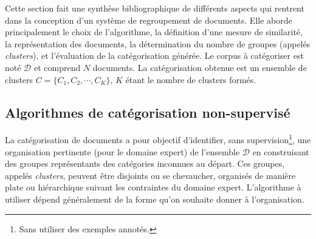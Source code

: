 Cette section fait une synthèse bibliographique de différents aspects qui rentrent dans la conception d'un système de regroupement de documents. Elle aborde principalement le choix de l'algorithme, la définition d'une mesure de similarité, la représentation des documents, la détermination du nombre de groupes (appelés \textit{clusters}), et l'évaluation de la catégorisation générée. Le corpus à catégoriser est noté $\mathcal{D}$ et comprend $N$ documents. La catégorisation obtenue est un ensemble de clusters $C = \lbrace C_1, C_2, \cdots, C_K \rbrace$, $K$ étant le nombre de clusters formés.

\subsection{Algorithmes de catégorisation non-supervisé}

La catégorisation de documents a pour objectif  d'identifier, sans supervision\footnote{Sans utiliser des exemples annotés.}, une organisation pertinente (pour le domaine expert) de l'ensemble $\mathcal{D}$ en construisant des groupes représentants des catégories inconnues au départ. Ces groupes, appelés \textit{clusters}, peuvent être disjoints ou se chevaucher, organisés de manière plate ou hiérarchique suivant les contraintes du domaine expert. L’algorithme à utiliser dépend généralement de la forme qu’on souhaite donner à l’organisation. 

